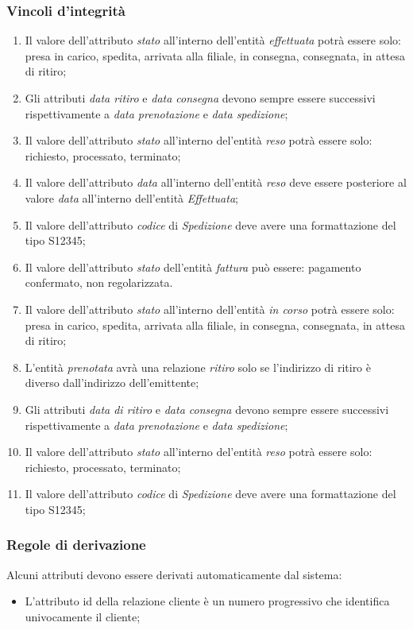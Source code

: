 \subsubsection*{Vincoli d'integrità}
\begin{enumerate}
  \item Il valore dell'attributo \textit{stato} all'interno dell'entità \textit{effettuata} potrà essere solo: presa in carico, spedita, arrivata alla filiale, in consegna, consegnata, in attesa di ritiro;
  \item Gli attributi \textit{data ritiro} e \textit{data consegna} devono sempre essere successivi rispettivamente a \textit{data prenotazione} e \textit{data spedizione};
	\item Il valore dell'attributo \textit{stato} all'interno del'entità \textit{reso} potrà essere solo: richiesto, processato, terminato;
	\item Il valore dell'attributo \textit{data} all'interno dell'entità \textit{reso} deve essere posteriore al valore \textit{data} all'interno dell'entità \textit{Effettuata};
	\item Il valore dell'attributo \textit{codice} di \textit{Spedizione} deve avere una formattazione del tipo S12345;
	\item Il valore dell'attributo \textit{stato} dell'entità \textit{fattura} può essere: pagamento confermato, non regolarizzata. 
	\item Il valore dell'attributo \textit{stato} all'interno dell'entità \textit{in corso} potrà essere solo: presa in carico, spedita, arrivata alla filiale, in consegna, consegnata, in attesa di ritiro;
	\item L'entità \textit{prenotata} avrà una relazione \textit{ritiro} solo se l'indirizzo di ritiro è diverso dall'indirizzo dell'emittente;
	\item Gli attributi \textit{data di ritiro} e \textit{data consegna} devono sempre essere successivi rispettivamente a \textit{data prenotazione} e \textit{data spedizione};
	\item Il valore dell'attributo \textit{stato} all'interno del'entità \textit{reso} potrà essere solo: richiesto, processato, terminato;
	\item Il valore dell'attributo \textit{codice} di \textit{Spedizione} deve avere una formattazione del tipo S12345;
	
\end{enumerate}

\subsubsection*{Regole di derivazione}
Alcuni attributi devono essere derivati automaticamente dal sistema:
\begin{itemize}
  \item L'attributo id della relazione cliente è un numero progressivo che identifica univocamente il cliente;
  
\end{itemize}
